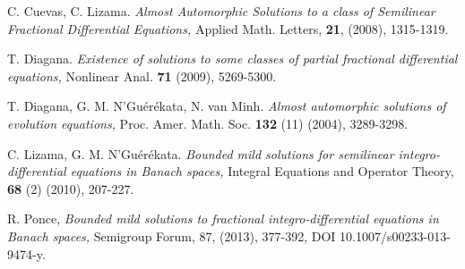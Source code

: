 \begin{titlepage}
\begin{minipage}{0.85\linewidth}
\begin{minipage}{0.85\linewidth}
\end{minipage}
\end{minipage}
\vspace{5pt}
\begin{thebibliography}{99}



 C. Cuevas, C. Lizama. {\it Almost Automorphic Solutions to a class of Semilinear Fractional Differential Equations,} Applied Math. Letters, {\bf 21}, (2008), 1315-1319.%

 T. Diagana. {\it Existence of solutions to some classes of partial fractional differential equations,} Nonlinear Anal. {\bf 71} (2009), 5269-5300.%

 T. Diagana, G. M. N'Gu\'er\'ekata, N. van Minh. {\it Almost automorphic solutions of evolution equations,} Proc. Amer. Math. Soc. {\bf 132} (11) (2004), 3289-3298.%

  C. Lizama, G. M. N'Gu\'er\'ekata. {\it Bounded mild solutions for semilinear integro-differential equations in Banach spaces,} Integral Equations and Operator Theory, {\bf 68} (2) (2010), 207-227.

 R. Ponce, {\it Bounded mild solutions to fractional integro-differential equations in Banach spaces,} Semigroup Forum, 87, (2013), 377-392, DOI 10.1007/s00233-013-9474-y.

\end{thebibliography}

\end{titlepage}
\pagestyle{eimat}
\pagecolor{ptcbackground}

